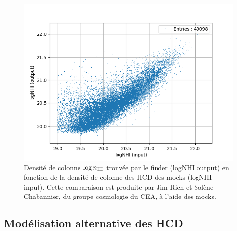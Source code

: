 \documentclass[11pt, twoside, a4paper, openright]{report}
\begin{document}
\begin{figure}
  \centering
  \includegraphics[scale=0.8]{nhi_finder.png}
  \caption{Densité de colonne $\log n_{\textsc{HI}}$ trouvée par le finder (logNHI output) en fonction de la densité de colonne des HCD des mocks (logNHI input). Cette comparaison est produite par Jim Rich et Solène Chabannier, du groupe cosmologie du CEA, à l'aide des mocks.}
  \label{fig:nhi_finder}
\end{figure}

\subsection{Modélisation alternative des HCD}
\end{document}
